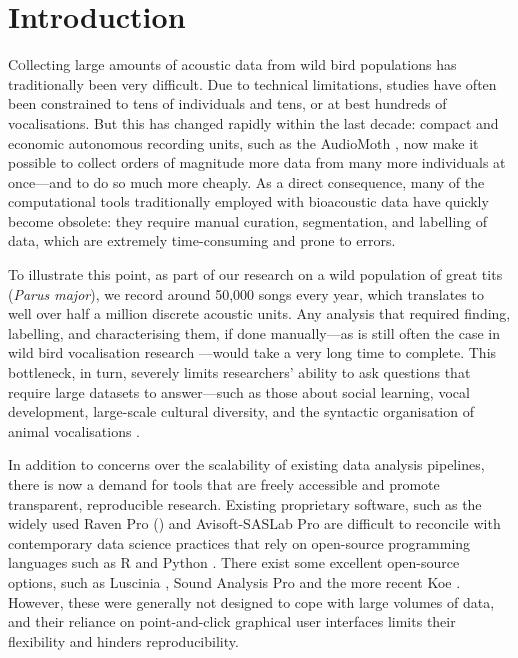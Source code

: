 \section{Introduction}

\lettrine[lines=2]Collecting large amounts of acoustic data from wild bird populations has
traditionally been very difficult. Due to technical limitations, studies have
often been constrained to tens of individuals and tens, or at best hundreds of
vocalisations. But this has changed rapidly within the last decade: compact and
economic autonomous recording units, such as the AudioMoth \parencite{hill2019}, now
make it possible to collect orders of magnitude more data from many more
individuals at once---and to do so much more cheaply. As a direct consequence,
many of the computational tools traditionally employed with bioacoustic data
have quickly become obsolete: they require manual curation, segmentation, and
labelling of data, which are extremely time-consuming and prone to errors.

To illustrate this point, as part of our research on a wild population of great
tits (\textit{Parus major}), we record around 50,000 songs every year, which
translates to well over half a million discrete acoustic units. Any analysis
that required finding, labelling, and characterising them, if done manually---as
is still often the case in wild bird vocalisation research \parencite{beecher2020a,
demko2018, mclean2020, pipek2018, youngblood2022}---would take a very long time to
complete. This bottleneck, in turn, severely limits researchers' ability to ask
questions that require large datasets to answer---such as those about social
learning, vocal development, large-scale cultural diversity, and the syntactic
organisation of animal vocalisations \parencite{aplin2019, kollmorgen2020,
lachlan2018, sainburg2019}.

In addition to concerns over the scalability of existing data analysis
pipelines, there is now a demand for tools that are freely accessible and
promote transparent, reproducible research. Existing proprietary software, such
as the widely used Raven Pro (\cite[up to \$800;][]{raven2019}) and Avisoft-SASLab Pro \parencite[up to \$2,835;][]{specht2002} are difficult to reconcile with contemporary data science practices that rely on open-source programming
languages such as R \parencite{rcoreteam2021} and Python \parencite{vanrossum1995}.
There exist some excellent open-source options, such as Luscinia
\parencite{lachlan2016a}, Sound Analysis Pro \parencite{tchernichovski2000} and the more
recent Koe \parencite{fukuzawa2020}. However, these were generally not designed to
cope with large volumes of data, and their reliance on point-and-click graphical
user interfaces limits their flexibility and hinders reproducibility.

